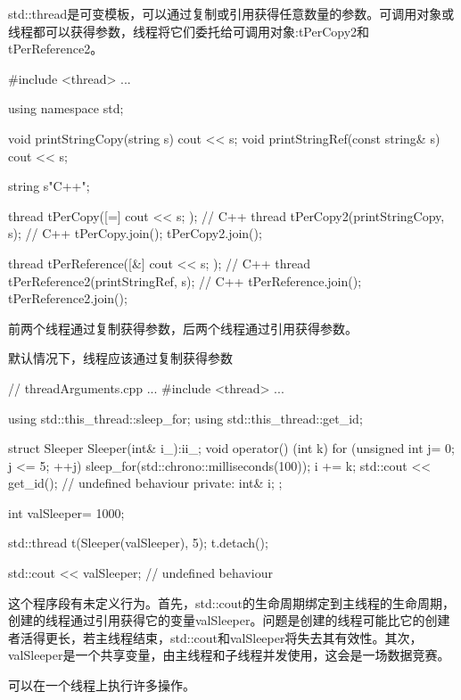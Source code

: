 
std::thread是可变模板，可以通过复制或引用获得任意数量的参数。可调用对象或线程都可以获得参数，线程将它们委托给可调用对象:tPerCopy2和tPerReference2。

\begin{cpp}
#include <thread>
...

using namespace std;

void printStringCopy(string s){ cout << s; }
void printStringRef(const string& s){ cout << s; }

string s{"C++"};

thread tPerCopy([=]{ cout << s; }); // C++
thread tPerCopy2(printStringCopy, s); // C++
tPerCopy.join();
tPerCopy2.join();

thread tPerReference([&]{ cout << s; }); // C++
thread tPerReference2(printStringRef, s); // C++
tPerReference.join();
tPerReference2.join();
\end{cpp}

前两个线程通过复制获得参数，后两个线程通过引用获得参数。

\begin{myWarning}{默认情况下，线程应该通过复制获得参数}
	
\begin{cpp}
// threadArguments.cpp
...
#include <thread>
...

using std::this_thread::sleep_for;
using std::this_thread::get_id;

struct Sleeper{
	Sleeper(int& i_):i{i_}{};
	void operator() (int k){
		for (unsigned int j= 0; j <= 5; ++j){
			sleep_for(std::chrono::milliseconds(100));
			i += k;
		}
		std::cout << get_id(); // undefined behaviour
	}
	private:
	int& i;
};

int valSleeper= 1000;

std::thread t(Sleeper(valSleeper), 5);
t.detach();

std::cout << valSleeper; // undefined behaviour
\end{cpp}

这个程序段有未定义行为。首先，std::cout的生命周期绑定到主线程的生命周期，创建的线程通过引用获得它的变量valSleeper。问题是创建的线程可能比它的创建者活得更长，若主线程结束，std::cout和valSleeper将失去其有效性。其次，valSleeper是一个共享变量，由主线程和子线程并发使用，这会是一场数据竞赛。
\end{myWarning}


可以在一个线程上执行许多操作。

